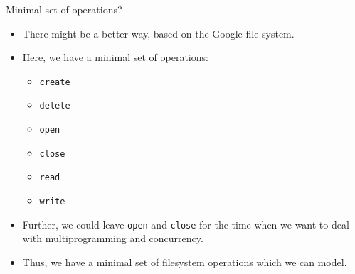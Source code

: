 \documentclass{beamer}
\begin{document}

\begin{frame}{Minimal set of operations?}
  \begin{itemize}
  \item There might be a better way, based on the Google file system.
  \item Here, we have a minimal set of operations:
    \begin{itemize}
    \item \texttt{create}
    \item \texttt{delete}
    \item \texttt{open}
    \item \texttt{close}
    \item \texttt{read}
    \item \texttt{write}
    \end{itemize}
  \item Further, we could leave \texttt{open} and \texttt{close} for
    the time when we want to deal with multiprogramming and
    concurrency.
  \item Thus, we have a minimal set of filesystem operations which we
    can model.
  \end{itemize}
\end{frame}
\end{document}
